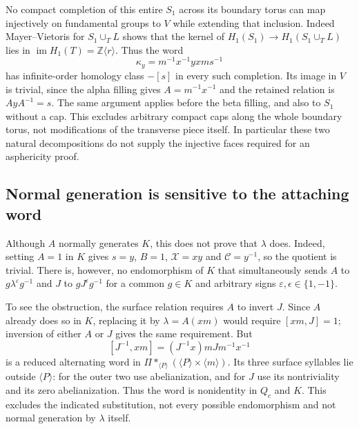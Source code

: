 \documentclass[11pt]{amsart}
\theoremstyle{definition}
\theoremstyle{remark}
\newcommand{\Z}{\mathbb Z}
\begin{document}
No compact completion of this entire $S_1$ across its boundary torus
can map injectively on fundamental groups to $V$ while extending that
inclusion. Indeed Mayer--Vietoris for $S_1\cup_T L$ shows that the
kernel of $H_1(S_1)\to H_1(S_1\cup_T L)$ lies in
$\operatorname{im}H_1(T)=\Z\langle r\rangle$. Thus the word
\[
                    \kappa_y=m^{-1}x^{-1}yxms^{-1}
\]
has infinite-order homology class $-[s]$ in every such completion.
Its image in $V$ is trivial, since the alpha filling gives
$A=m^{-1}x^{-1}$ and the retained relation is $AyA^{-1}=s$.
The same argument applies before the beta filling, and also to
$S_1$ without a cap. This excludes arbitrary compact caps along the
whole boundary torus, not modifications of the transverse piece itself.
In particular these two natural decompositions do not supply the
injective faces required for an asphericity proof.

\subsection{Normal generation is sensitive to the attaching word}
Although $A$ normally generates $K$, this does not prove that
$\lambda$ does. Indeed, setting $A=1$ in $K$ gives $s=y$, $B=1$,
$\mathcal X=xy$ and $\mathcal C=y^{-1}$, so the quotient is trivial.
There is, however, no endomorphism of $K$ that simultaneously sends
$A$ to $g\lambda^{\varepsilon}g^{-1}$ and $J$ to
$gJ^{\epsilon}g^{-1}$ for a common $g\in K$ and arbitrary signs
$\varepsilon,\epsilon\in\{1,-1\}$.

To see the obstruction, the surface relation requires $A$ to invert
$J$. Since $A$ already does so in $K$, replacing it by
$\lambda=A(xm)$ would require $[xm,J]=1$; inversion of either
$A$ or $J$ gives the same requirement. But
\[
 [J^{-1},xm]=(J^{-1}x)mJm^{-1}x^{-1}
\]
is a reduced alternating word in
$\Pi*_{\langle P\rangle}(\langle P\rangle\times\langle m\rangle)$.
Its three surface syllables lie outside $\langle P\rangle$:
for the outer two use abelianization, and for $J$ use its nontriviality
and its zero abelianization. Thus the word is nonidentity in $Q_c$
and $K$. This excludes the indicated substitution, not every possible
endomorphism and not normal generation by $\lambda$ itself.
\end{document}
